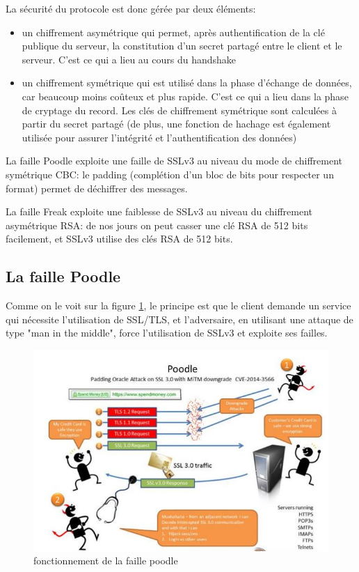 La sécurité du protocole est donc gérée par deux éléments:
\begin{itemize}
\item un chiffrement asymétrique qui permet, après authentification de la clé publique du serveur, la constitution d'un secret partagé entre le client et le serveur. C'est ce qui a lieu au cours du handshake
\item un chiffrement symétrique qui est utilisé dans la phase d'échange de données, car beaucoup moins coûteux et plus rapide. C'est ce qui a lieu dans la phase de cryptage du record. Les clés de chiffrement symétrique sont calculées à partir du secret partagé (de plus, une fonction de hachage est également utilisée pour assurer l'intégrité et l'authentification des données)
\end{itemize}

La faille Poodle exploite une faille de SSLv3 au niveau du mode de chiffrement symétrique CBC: le padding (complétion d'un bloc de bits pour respecter un format) permet de déchiffrer des messages. 


La faille Freak exploite une faiblesse de SSLv3 au niveau du chiffrement asymétrique RSA: de nos jours on peut casser une clé RSA de 512 bits facilement, et SSLv3 utilise des clés RSA de 512 bits.

\subsection{La faille Poodle}

Comme on le voit sur la figure \ref{poodle}, le principe est que le client demande un service qui nécessite l'utilisation de SSL/TLS, et l'adversaire, en utilisant une attaque de type "man in the middle", force l'utilisation de SSLv3 et exploite ses failles.

\begin{figure}[H]
\includegraphics[scale=0.7]{img/poodle.jpg}
\caption{fonctionnement de la faille poodle}
\label{poodle}
\end{figure}

